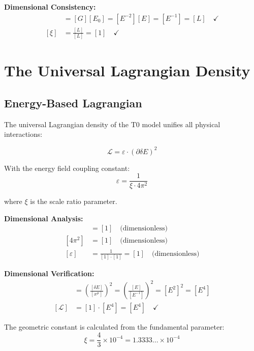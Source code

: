 \documentclass[12pt,a4paper]{report}
\newcommand{\rzero}{r_0}                  %
\begin{document}
	\textbf{Dimensional Consistency:}
	\begin{align}
		[\rzero] &= [G][E_0] = [E^{-2}][E] = [E^{-1}] = [L] \quad \checkmark \\
		[\xi] &= \frac{[L]}{[L]} = [1] \quad \checkmark
	\end{align}
	
	\section{The Universal Lagrangian Density}
	\label{sec:universal_lagrangian}
\subsection{Energy-Based Lagrangian}
\label{subsec:energy_based_lagrangian}

The universal Lagrangian density of the T0 model unifies all physical interactions:

\begin{equation}
	\boxed{\mathcal{L} = \varepsilon \cdot (\partial \delta E)^2}
	\label{eq:universal_lagrangian_density}
\end{equation}

With the energy field coupling constant:
\begin{equation}
	\varepsilon = \frac{1}{\xi \cdot 4\pi^2}
\end{equation}

where $\xi$ is the scale ratio parameter.

\textbf{Dimensional Analysis:}
\begin{align}
	[\xi] &= [1] \quad \text{(dimensionless)} \\
	[4\pi^2] &= [1] \quad \text{(dimensionless)} \\
	[\varepsilon] &= \frac{1}{[1] \cdot [1]} = [1] \quad \text{(dimensionless)}
\end{align}

\textbf{Dimensional Verification:}
\begin{align}
	[(\partial \delta E)^2] &= \left(\frac{[\delta E]}{[x^\mu]}\right)^2 = \left(\frac{[E]}{[E^{-1}]}\right)^2 = [E^2]^2 = [E^4] \\
	[\mathcal{L}] &= [1] \cdot [E^4] = [E^4] \quad \checkmark
\end{align}

The geometric constant is calculated from the fundamental parameter:
\begin{equation}
	\xi = \frac{4}{3} \times 10^{-4} = 1.3333... \times 10^{-4}
\end{equation}
\end{document}
